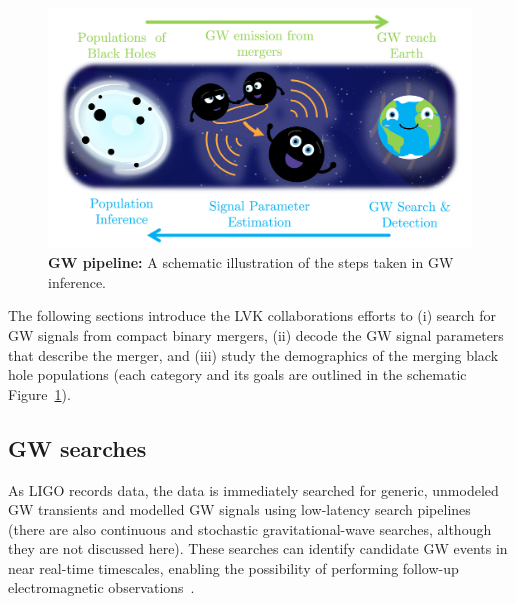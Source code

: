 \begin{figure}
\begin{center}
  \centerline{\includegraphics[width=1.1\linewidth]{src/figures/gw_pipeline.png}}
  \caption{\textbf{GW pipeline:} A schematic illustration of the steps taken in GW inference. }
  \label{fig:gw_pipeline}
\end{center}
\end{figure}

The following sections introduce the LVK collaborations efforts to (i) search for GW signals from compact binary mergers, (ii) decode the GW signal parameters that describe the merger, and (iii) study the demographics of the merging black hole populations (each category and its goals are outlined in the schematic Figure~\ref{fig:gw_pipeline}).


\subsection{GW searches}  \label{sec:searches}

As LIGO records data, the data is immediately searched for generic, unmodeled  GW transients and modelled GW signals using low-latency search pipelines (there are also continuous and stochastic gravitational-wave searches, although they are not discussed here). 
These searches can identify candidate GW events in near real-time timescales, enabling the possibility of performing follow-up electromagnetic observations~\cite{abbott2018prospects, gw_search_review}.

